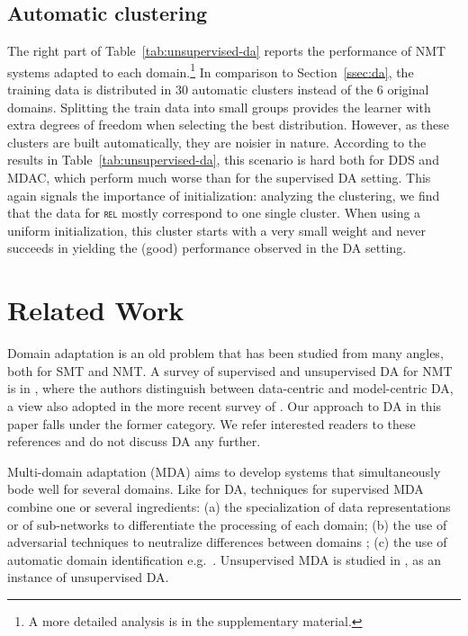 \documentclass[11pt]{article}
\newcommand{\domain}[1]{\texttt{\textsc{#1}}}
\begin{document}
\subsection{Automatic clustering}\label{ssec:clda}
The right part of Table~\ref{tab:unsupervised-da} reports the performance of NMT systems adapted to each domain.\footnote{A more detailed analysis is in the supplementary material.} In comparison to Section~\ref{ssec:da}, the training data is distributed in 30 automatic clusters instead of the 6 original domains. Splitting the train data into small groups provides the learner with extra degrees of freedom when selecting the best distribution. However, as these clusters are built automatically, they are noisier in nature. According to the results in Table~\ref{tab:unsupervised-da}, this scenario is hard both for DDS and MDAC, which perform much worse than for the supervised DA setting. This again signals the importance of initialization: analyzing the clustering, we find that the data for \domain{rel} mostly correspond to one single cluster. When using a uniform initialization, this cluster starts with a very small weight and never succeeds in yielding the (good) performance observed in the DA setting.

\section{Related Work \label{sec:related}}

Domain adaptation is an old problem that has been studied from many angles, both for SMT and NMT. A survey of supervised and unsupervised DA for NMT is in \citet{Chu18asurvey}, where the authors distinguish between data-centric and model-centric DA, a view also adopted in the more recent survey of \citet{Saunders21asurvey}. Our approach to DA in this paper falls under the former category. We refer interested readers to these references and do not discuss DA any further.

Multi-domain adaptation (MDA) aims to develop systems that simultaneously bode well for several domains. Like for DA, techniques for supervised MDA combine one or several ingredients: (a) the specialization of data representations \citep{Kobus17domaincontrol} or of sub-networks \citep{Pham19generic} to differentiate the processing of each domain; (b) the use of adversarial techniques to neutralize differences between domains \citep{Britz17mixing,Zeng18multidomain}; (c) the use of automatic domain identification e.g.\ \citet{Jiang19multidomain}. Unsupervised MDA is studied in \citet{Farajian17multidomain}, as an instance of unsupervised DA.
\end{document}
